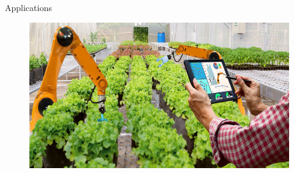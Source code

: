 \documentclass[10pt,xcolor={dvipsnames}]{beamer}
\begin{document}
\begin{frame}{Applications}
\begin{figure}
\begin{minipage}[l]{.5\linewidth}
			\end{minipage}%
			\begin{minipage}[r]{.5\linewidth}
				\centering
				\includegraphics[height=.5\linewidth,width=\linewidth,keepaspectratio,clip]{multi_robot_4}
			\end{minipage}
		\end{figure}
		
	\end{frame}
	
	
	
\end{document}
